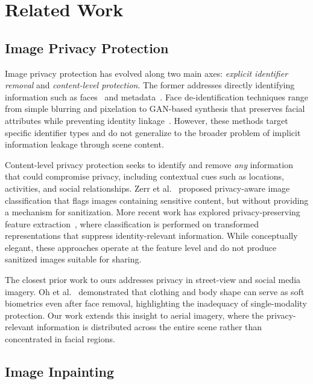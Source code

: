 \documentclass[preprint,12pt]{elsarticle}
\begin{document}
\section{Related Work}
\label{sec:related}

\subsection{Image Privacy Protection}

Image privacy protection has evolved along two main axes: \emph{explicit identifier removal} and \emph{content-level protection}. The former addresses directly identifying information such as faces~\cite{du2014face,li2019face,oh2016face} and metadata~\cite{zerr2012privacy}. Face de-identification techniques range from simple blurring and pixelation to GAN-based synthesis that preserves facial attributes while preventing identity linkage~\cite{ryoo2017privacy}. However, these methods target specific identifier types and do not generalize to the broader problem of implicit information leakage through scene content.

Content-level privacy protection seeks to identify and remove \emph{any} information that could compromise privacy, including contextual cues such as locations, activities, and social relationships. Zerr et al.~\cite{zerr2012privacy} proposed privacy-aware image classification that flags images containing sensitive content, but without providing a mechanism for sanitization. More recent work has explored privacy-preserving feature extraction~\cite{ryoo2017privacy}, where classification is performed on transformed representations that suppress identity-relevant information. While conceptually elegant, these approaches operate at the feature level and do not produce sanitized images suitable for sharing.

The closest prior work to ours addresses privacy in street-view and social media imagery. Oh et al.~\cite{oh2016face} demonstrated that clothing and body shape can serve as soft biometrics even after face removal, highlighting the inadequacy of single-modality protection. Our work extends this insight to aerial imagery, where the privacy-relevant information is distributed across the entire scene rather than concentrated in facial regions.

\subsection{Image Inpainting}
\end{document}
